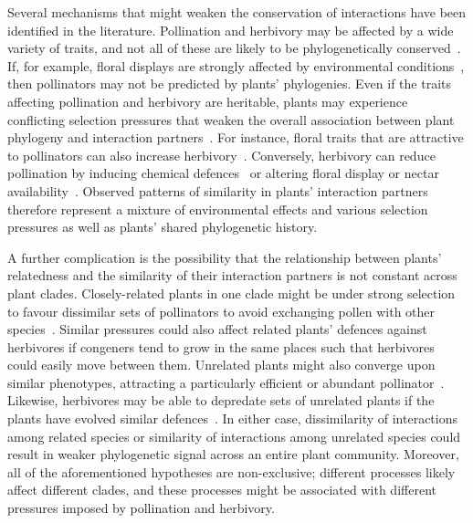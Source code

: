\documentclass[12pt]{article}
\begin{document}
\begin{spacing}{1.5}
  Several mechanisms that might weaken the conservation of interactions
  have been identified in the literature. Pollination and herbivory may be affected
  by a wide variety of traits, and not all of these are likely to be
  phylogenetically conserved~\citep{Rezende2007,Kursar2009}. If, for example,
  floral displays are strongly affected by environmental conditions~\citep{Canto2004}, 
  then pollinators may not be predicted by plants' phylogenies.
  Even if the traits affecting pollination and herbivory are
  heritable, plants may experience conflicting selection pressures that
  weaken the overall association between plant phylogeny and interaction
  partners~\citep{Armbruster1997,Lankau2007,Siepielski2010,Wise2013}. 
  For instance, floral traits that
  are attractive to pollinators can also increase 
  herbivory~\citep{Strauss2002,Adler2004,Theis2006}. 
  Conversely, herbivory can reduce pollination by inducing chemical 
  defences~\citep{Adler2006} or altering floral display or nectar 
  availability~\citep{Strauss1997}. Observed patterns
  of similarity in plants' interaction partners therefore represent
  a mixture of environmental effects and various selection pressures as
  well as plants' shared phylogenetic history.


  A further complication is the possibility that the relationship between
  plants' relatedness and the similarity of their interaction partners is
  not constant across plant clades. Closely-related plants
  in one clade might be under strong selection to favour dissimilar
  sets of pollinators to avoid exchanging pollen with other
  species~\citep{Levin1970,Bell2005,Mitchell2009}. Similar pressures 
  could also affect related plants' defences against herbivores if 
  congeners tend to grow in the same places such that herbivores 
  could easily move between them.  Unrelated plants might also 
  converge upon similar phenotypes, attracting a particularly 
  efficient or abundant pollinator~\citep{Ollerton1996,Ollerton2009}. 
  Likewise, herbivores may be able to depredate sets of unrelated 
  plants if the plants have evolved similar defences~\citep{Pichersky2000}. 
  In either case, dissimilarity of interactions among related species 
  or similarity of interactions among unrelated species could result 
  in weaker phylogenetic signal across an entire plant community. 
  Moreover, all of the aforementioned hypotheses 
  are non-exclusive; different processes likely affect different
  clades, and these processes might be associated with different 
  pressures imposed by pollination and herbivory. 



\end{spacing}
\end{document}
